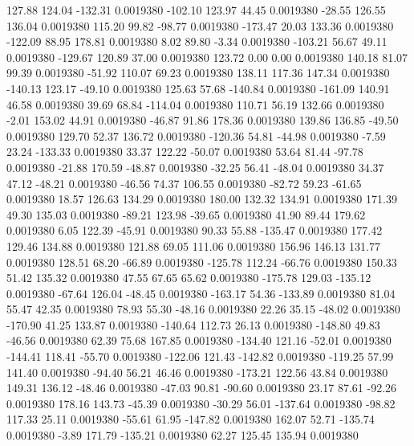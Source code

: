   127.88  124.04 -132.31   0.0019380
 -102.10  123.97   44.45   0.0019380
  -28.55  126.55  136.04   0.0019380
  115.20   99.82  -98.77   0.0019380
 -173.47   20.03  133.36   0.0019380
 -122.09   88.95  178.81   0.0019380
    8.02   89.80   -3.34   0.0019380
 -103.21   56.67   49.11   0.0019380
 -129.67  120.89   37.00   0.0019380
  123.72    0.00    0.00   0.0019380
  140.18   81.07   99.39   0.0019380
  -51.92  110.07   69.23   0.0019380
  138.11  117.36  147.34   0.0019380
 -140.13  123.17  -49.10   0.0019380
  125.63   57.68 -140.84   0.0019380
 -161.09  140.91   46.58   0.0019380
   39.69   68.84 -114.04   0.0019380
  110.71   56.19  132.66   0.0019380
   -2.01  153.02   44.91   0.0019380
  -46.87   91.86  178.36   0.0019380
  139.86  136.85  -49.50   0.0019380
  129.70   52.37  136.72   0.0019380
 -120.36   54.81  -44.98   0.0019380
   -7.59   23.24 -133.33   0.0019380
   33.37  122.22  -50.07   0.0019380
   53.64   81.44  -97.78   0.0019380
  -21.88  170.59  -48.87   0.0019380
  -32.25   56.41  -48.04   0.0019380
   34.37   47.12  -48.21   0.0019380
  -46.56   74.37  106.55   0.0019380
  -82.72   59.23  -61.65   0.0019380
   18.57  126.63  134.29   0.0019380
  180.00  132.32  134.91   0.0019380
  171.39   49.30  135.03   0.0019380
  -89.21  123.98  -39.65   0.0019380
   41.90   89.44  179.62   0.0019380
    6.05  122.39  -45.91   0.0019380
   90.33   55.88 -135.47   0.0019380
  177.42  129.46  134.88   0.0019380
  121.88   69.05  111.06   0.0019380
  156.96  146.13  131.77   0.0019380
  128.51   68.20  -66.89   0.0019380
 -125.78  112.24  -66.76   0.0019380
  150.33   51.42  135.32   0.0019380
   47.55   67.65   65.62   0.0019380
 -175.78  129.03 -135.12   0.0019380
  -67.64  126.04  -48.45   0.0019380
 -163.17   54.36 -133.89   0.0019380
   81.04   55.47   42.35   0.0019380
   78.93   55.30  -48.16   0.0019380
   22.26   35.15  -48.02   0.0019380
 -170.90   41.25  133.87   0.0019380
 -140.64  112.73   26.13   0.0019380
 -148.80   49.83  -46.56   0.0019380
   62.39   75.68  167.85   0.0019380
 -134.40  121.16  -52.01   0.0019380
 -144.41  118.41  -55.70   0.0019380
 -122.06  121.43 -142.82   0.0019380
 -119.25   57.99  141.40   0.0019380
  -94.40   56.21   46.46   0.0019380
 -173.21  122.56   43.84   0.0019380
  149.31  136.12  -48.46   0.0019380
  -47.03   90.81  -90.60   0.0019380
   23.17   87.61  -92.26   0.0019380
  178.16  143.73  -45.39   0.0019380
  -30.29   56.01 -137.64   0.0019380
  -98.82  117.33   25.11   0.0019380
  -55.61   61.95 -147.82   0.0019380
  162.07   52.71 -135.74   0.0019380
   -3.89  171.79 -135.21   0.0019380
   62.27  125.45  135.94   0.0019380
